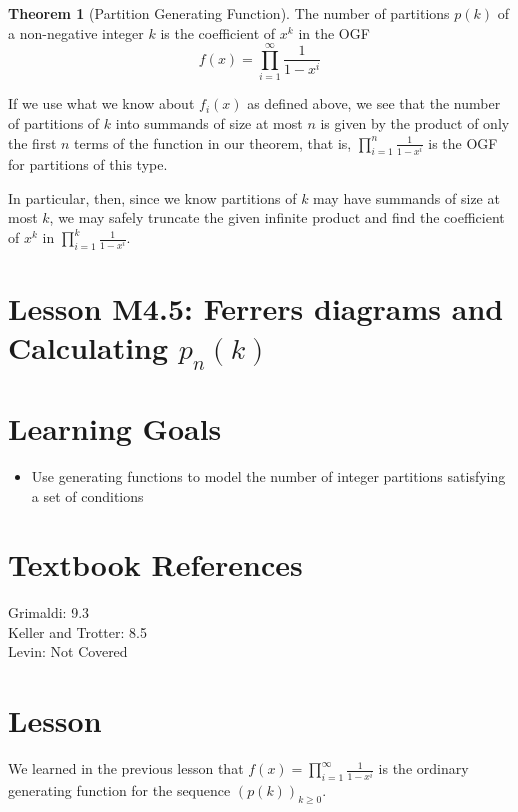 \documentclass{article}
\theoremstyle{definition}
\newtheorem{theorem}{Theorem}
\begin{document}
\begin{theorem}[Partition Generating Function]
The number of partitions $p(k)$ of a non-negative integer $k$ is the coefficient of $x^{k}$ in the OGF
\[f(x)=\prod_{i=1}^{\infty} \frac{1}{1-x^{i}}\]
\end{theorem}

If we use what we know about $f_{i}(x)$ as defined above, we see that the number of partitions of $k$ into summands of size at most $n$ is given by the product of only the first $n$ terms of the function in our theorem, that is, $\prod_{i=1}^{n} \frac{1}{1-x^{i}}$ is the OGF for partitions of this type.

In particular, then, since we know partitions of $k$ may have summands of size at most $k$, we may safely truncate the given infinite product and find the coefficient of $x^{k}$ in $\prod_{i=1}^{k} \frac{1}{1-x^{i}}$.













\newpage


\section*{Lesson M4.5: Ferrers diagrams and Calculating $p_{n}(k)$}
\section*{Learning Goals}
\begin{itemize}
  \item Use generating functions to model the number of integer partitions satisfying a set of conditions
\end{itemize}

\section*{Textbook References}
Grimaldi: 9.3\\
Keller and Trotter: 8.5\\
Levin: Not Covered

\section*{Lesson}
We learned in the previous lesson that $f(x)=\prod_{i=1}^{\infty} \frac{1}{1-x^{i}}$ is the ordinary generating function for the sequence $(p(k))_{k \geq 0}$.
\end{document}
